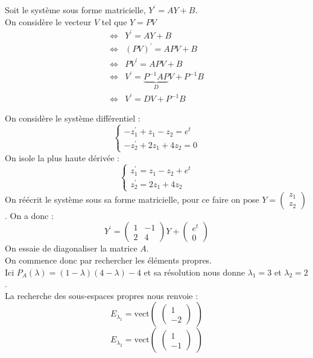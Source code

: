 \begin{demo}
Soit le système sous forme matricielle, $Y^{\prime}=AY+B$.\\
On considère le vecteur $V$ tel que $Y=PV$
\begin{align*}
    \Leftrightarrow & Y^{\prime}=AY+B\\
    \Leftrightarrow & (PV)^{\prime}=APV+B\\
    \Leftrightarrow & PV^{\prime}=APV+B\\
    \Leftrightarrow & V^{\prime}=\underbrace{P^{-1}AP}_{D}V+P^{-1}B\\
    \Leftrightarrow & V^{\prime}=DV+P^{-1}B
\end{align*}
\end{demo}
\begin{ex}
On considère le système différentiel :
$$\begin{cases}
-z_1^{\prime}+z_1-z_2=e^{t}\\
-z_2^{\prime}+2z_1+4z_2=0
\end{cases}$$
On isole la plus haute dérivée :
$$\begin{cases}
z_1^{\prime}=z_1-z_2+e^{t}\\
z_2^{\prime}=2z_1+4z_2
\end{cases}$$
On réécrit le système sous sa forme matricielle, pour ce faire on pose $Y=\begin{pmatrix}z_1\\z_2\end{pmatrix}$. On a donc :
$$Y^{\prime}=\begin{pmatrix}1&-1\\2&4\end{pmatrix}Y+\begin{pmatrix}e^t\\0\end{pmatrix}$$
On essaie de diagonaliser la matrice $A$.\\
On commence donc par rechercher les éléments propres.\\
Ici $P_A(\lambda)=(1-\lambda)(4-\lambda)-4$ et sa résolution nous donne $\lambda_1=3$ et $\lambda_2=2$.\\
La recherche des sous-espaces propres nous renvoie :
$$E_{\lambda_1}=\text{vect}\begin{pmatrix}\begin{pmatrix}1\\-2\end{pmatrix}\end{pmatrix}$$
$$E_{\lambda_2}=\text{vect}\begin{pmatrix}\begin{pmatrix}1\\-1\end{pmatrix}\end{pmatrix}$$

\end{ex}
